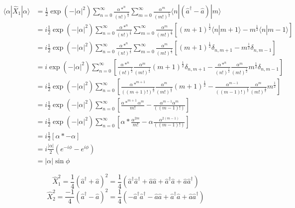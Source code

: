 \documentclass[a4paper,11pt]{article}
\begin{document}
\begin{equation*}
\begin{split}
\langle\alpha|\hat{X}_1|\alpha\rangle & =\frac{1}{2} \exp\left(-|\alpha|^2\right) \sum_{n=0}^{\infty}\frac{\alpha*^n}{(n!)^\frac{1}{2}}  \sum_{m=0}^{\infty}\frac{\alpha^m}{(m!)^\frac{1}{2}}\langle n|(\hat{a}^\dag-\hat{a}) |m\rangle \\
& = i\frac{1}{2} \exp\left(-|\alpha|^2\right) \sum_{n=0}^{\infty}\frac{\alpha*^n}{(n!)^\frac{1}{2}}  \sum_{m=0}^{\infty}\frac{\alpha^m}{(m!)^\frac{1}{2}}\left[(m+1)^\frac{1}{2}\langle n|m+1\rangle-m^\frac{1}{2}\langle n |m-1\rangle\right] \\
& = i\frac{1}{2} \exp\left(-|\alpha|^2\right) \sum_{n=0}^{\infty}\frac{\alpha*^n}{(n!)^\frac{1}{2}}  \sum_{m=0}^{\infty}\frac{\alpha^m}{(m!)^\frac{1}{2}}\left[(m+1)^\frac{1}{2}\delta_{n,m+1}-m^\frac{1}{2}\delta_{n,m-1}\right] \\
& = i\exp\left(-|\alpha|^2\right) \sum_{n=0}^{\infty}\left[\frac{\alpha*^n}{(n!)^\frac{1}{2}}  \frac{\alpha^m}{(m!)^\frac{1}{2}}(m+1)^\frac{1}{2}\delta_{n,m+1}-\frac{\alpha*^n}{(n!)^\frac{1}{2}}  \frac{\alpha^m}{(m!)^\frac{1}{2}}m^\frac{1}{2}\delta_{n,m-1}\right] \\
& = i\frac{1}{2} \exp\left(-|\alpha|^2\right) \sum_{n=0}^{\infty}\left[\frac{\alpha*^{m+1}}{((m+1)!)^\frac{1}{2}}  \frac{\alpha^m}{(m!)^\frac{1}{2}}(m+1)^\frac{1}{2}-\frac{\alpha^{m-1}}{((m-1)!)^\frac{1}{2}}  \frac{\alpha^m}{(m!)^\frac{1}{2}}m^\frac{1}{2}\right] \\
& = i\frac{1}{2} \exp\left(-|\alpha|^2\right) \sum_{n=0}^{\infty}\left[\frac{\alpha*^{m+1}\alpha^m}{m!}  -\frac{\alpha^{m-1}\alpha^m}{((m-1)!)}\right] \\
& = i\frac{1}{2} \exp\left(-|\alpha|^2\right) \sum_{n=0}^{\infty}\left[\alpha*\frac{\alpha^{2m}}{m!}  -\alpha\frac{\alpha^{2(m-1)}}{((m-1)!)}\right] \\
& = i\frac{1}{2} \left[\alpha* -\alpha\right] \\
& = i\frac{|\alpha|}{2}(e^{-i\phi} - e^{i\phi}) \\
& = |\alpha|\sin\phi
\end{split}
\end{equation*}

$$\hat{X}_1^2 = \frac{1}{4} (\hat{a}^\dag+\hat{a})^2 = \frac{1}{4} (\hat{a}^\dag\hat{a}^\dag+\hat{a}\hat{a}+\hat{a}^\dag\hat{a}+\hat{a}\hat{a}^\dag) $$
$$\hat{X}_2^2 = \frac{-1}{4} (\hat{a}^\dag-\hat{a})^2 = \frac{1}{4} (-\hat{a}^\dag\hat{a}^\dag-\hat{a}\hat{a}+\hat{a}^\dag\hat{a}+\hat{a}\hat{a}^\dag) $$
\end{document}
